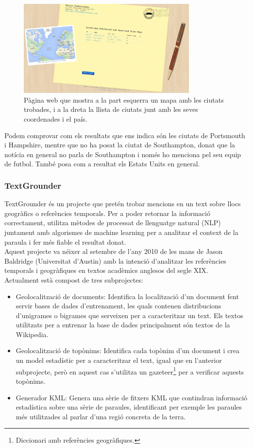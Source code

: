 \documentclass[12pt,a4paper,openright,oneside]{article}
\numberwithin{equation}{section}
\theoremstyle{definition}
\begin{document}
\begin{figure}[htbp]
\centering
\includegraphics[width=9cm]{clavin-2.png}
\caption{Pàgina web que mostra a la part esquerra un mapa amb les ciutats trobades, i a la dreta la llista de ciutats junt amb les seves coordenades i el país.\cite{clavin}}
\end{figure}Podem comprovar com els resultats que ens indica són les ciutats de Portsmouth i Hampshire, mentre que no ha posat la ciutat de Southampton, donat que la notícia en general no parla de Southampton i només ho menciona pel seu equip de futbol. També posa com a resultat els Estats Units en general.\cite{clavin}
\newpage
\subsubsection*{TextGrounder}
TextGrounder és un projecte que pretén trobar mencions en un text sobre llocs geogràfics o referències temporals. Per a poder retornar la informació correctament, utilitza mètodes de processat de llenguatge natural (NLP) juntament amb algorismes de machine learning per a analitzar el context de la paraula i fer més fiable el resultat donat.\\
Aquest projecte va néixer al setembre de l'any 2010 de les mans de Jason Baldridge (Universitat d'Austin) amb la intenció d'analitzar les referències temporals i geogràfiques en textos acadèmics anglesos del segle XIX.\\
Actualment està compost de tres subprojectes:
\begin{itemize}
\item Geolocalització de documents: Identifica la localització d'un document fent servir bases de dades d'entrenament, les quals contenen distribucions d'unigrames o bigrames que serveixen per a caracteritzar un text. Els textos utilitzats per a entrenar la base de dades principalment són textos de la Wikipedia.
\item Geolocalització de topònims: Identifica cada topònim d'un document i crea un model estadístic per a caracteritzar el text, igual que en l'anterior subprojecte, però en aquest cas s'utilitza un gazeteer\footnote{Diccionari amb referències geogràfiques.} per a verificar aquests topònims.
\item Generador KML: Genera una sèrie de fitxers KML que contindran informació estadística sobre una sèrie de paraules, identificant per exemple les paraules més utilitzades al parlar d'una regió concreta de la terra.\cite{textgrounder}
\end{itemize}
\end{document}
